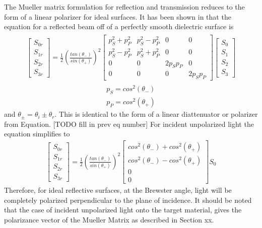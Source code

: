 
The Mueller matrix formulation for reflection and transmission reduces to the form of a linear polarizer for ideal surfaces.  It has been shown in \cite{polarizedlight} that the equation for a reflected beam off of a perfectly smooth dielectric surface is
%
\begin{align}
    \begin{split}
    \begin{bmatrix}
        S_{0r} \\
        S_{1r} \\
        S_{2r} \\
        S_{3r}
    \end{bmatrix}
    =
    \frac{1}{2}(\frac{tan(\theta_{-})}{sin(\theta_{+})})^2
    \begin{bmatrix}
       p_S^2 + p_P^2 & p_S^2 - p_P^2 & 0 & 0 \\
        p_S^2 - p_P^2 & p_S^2 + p_P^2 & 0 & 0 \\
        0 & 0 & 2p_Sp_P & 0 \\
        0 & 0 & 0 & 2p_Sp_P
    \end{bmatrix}
    \begin{bmatrix}
        S_0 \\
        S_1 \\
        S_2 \\
        S_3
    \end{bmatrix}
    \end{split}
\end{align}
%
\begin{align}
    p_S = cos^2(\theta_{-}) \\
    p_P = cos^2(\theta_{+})
\end{align}
and $\theta_{\pm}=\theta_i \pm \theta_r$.
This is identical to the form of a linear diattenuator or polarizer from Equation.
[TODO fill in prev eq number]
For incident unpolarized light the equation simplifies to
%
\begin{align}
    \begin{bmatrix}
        S_{0r} \\
        S_{1r} \\
        S_{2r} \\
        S_{3r}
    \end{bmatrix}
    =
    \frac{1}{2}(\frac{tan(\theta_{-})}{sin(\theta_{+})})^2
    \begin{bmatrix}
        cos^2(\theta_{-}) + cos^2(\theta_{+}) \\
        cos^2(\theta_{-}) - cos^2(\theta_{+}) \\
        0 \\
        0
    \end{bmatrix}
    S_0
\end{align}
%
Therefore, for ideal reflective surfaces, at the Brewster angle, light will be completely polarized perpendicular to the plane of incidence. It should be noted that the case of incident unpolarized light onto the target material, gives the polarizance vector of the Mueller Matrix as described in Section xx.

